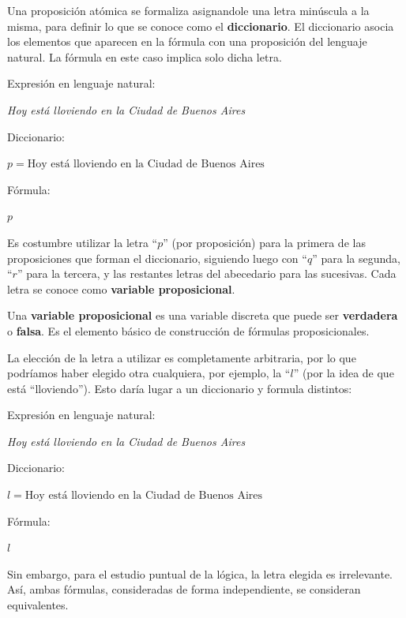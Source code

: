 Una proposición atómica se formaliza asignandole una letra minúscula a la misma,
para definir lo que se conoce como el \textbf{diccionario}.
El diccionario asocia los elementos que aparecen en la fórmula con una
proposición del lenguaje natural. La fórmula en este caso implica solo dicha
letra.

\begin{example}
    \sindent Expresión en lenguaje natural:

    \dindent \textit{Hoy está lloviendo en la Ciudad de Buenos Aires}

    \sindent Diccionario:

    \dindent $p = \text{Hoy está lloviendo en la Ciudad de Buenos Aires}$

    \sindent Fórmula:

    \dindent $p$
\end{example}

Es costumbre utilizar la letra ``$p$'' (por proposición) para la primera de las
proposiciones que forman el diccionario, siguiendo luego con ``$q$'' para la
segunda, ``$r$'' para la tercera, y las restantes letras del abecedario para las
sucesivas. Cada letra se conoce como \textbf{variable proposicional}.

\begin{definition}
    Una \textbf{variable proposicional} es una
    variable discreta que puede ser \textbf{verdadera} o \textbf{falsa}. Es el
    elemento básico de construcción de fórmulas proposicionales.
\end{definition}

La elección de la letra a utilizar es completamente arbitraria, por lo que
podríamos haber elegido otra cualquiera, por ejemplo, la ``$l$'' (por la idea de
que está ``lloviendo''). Esto daría lugar a un diccionario y formula distintos:

\begin{example}
    \sindent Expresión en lenguaje natural:

    \dindent \textit{Hoy está lloviendo en la Ciudad de Buenos Aires}

    \sindent Diccionario:

    \dindent $l = \text{Hoy está lloviendo en la Ciudad de Buenos Aires}$

    \sindent Fórmula:

    \dindent $l$
\end{example}

Sin embargo, para el estudio puntual de la lógica, la letra elegida es
irrelevante. Así, ambas fórmulas, consideradas de forma independiente, se
consideran equivalentes.

